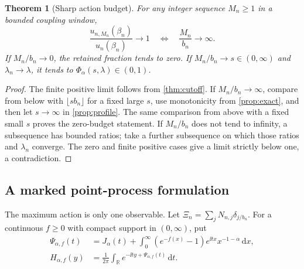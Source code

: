 \documentclass[11pt,a4paper]{article}
\numberwithin{equation}{section}
\newtheorem{theorem}{Theorem}[section]
\theoremstyle{definition}\newtheorem{definition}[theorem]{Definition}
\theoremstyle{remark}\newtheorem{remark}[theorem]{Remark}
\theoremstyle{definition}
\newcommand{\R}{\mathbb R}\newcommand{\C}{\mathbb C}
\newcommand{\dd}{\,\mathrm d}
\begin{document}
\begin{theorem}[Sharp action budget]\label{thm:budget}
For any integer sequence $M_n\ge1$ in a bounded coupling window,
\begin{equation}\label{eq:budgetiff}
 \frac{u_{n,M_n}(\beta_n)}{u_n(\beta_n)}\longrightarrow1
 \quad\Longleftrightarrow\quad \frac{M_n}{b_n}\longrightarrow\infty.
\end{equation}
If $M_n/b_n\to0$, the retained fraction tends to zero. If
$M_n/b_n\to s\in(0,\infty)$ and $\lambda_n\to\lambda$, it tends to
$\Phi_\alpha(s,\lambda)\in(0,1)$.
\end{theorem}
\begin{proof}
The finite positive limit follows from \cref{thm:cutoff}. If $M_n/b_n\to
\infty$, compare from below with $\lfloor s b_n\rfloor$ for a fixed large
$s$, use monotonicity from \cref{prop:exact}, and then let $s\to\infty$ in
\cref{prop:profile}. The same comparison from above with a fixed small $s$
proves the zero-budget statement. If $M_n/b_n$ does not tend to infinity,
a subsequence has bounded ratios; take a further subsequence on which
those ratios and $\lambda_n$ converge. The zero and finite positive cases
give a limit strictly below one, a contradiction.
\end{proof}

\subsection{A marked point-process formulation}
The maximum action is only one observable. Let
$\Xi_n=\sum_jN_{n,j}\delta_{j/b_n}$. For a continuous $f\ge0$ with compact
support in $(0,\infty)$, put
\begin{align}
 \Psi_{\alpha,f}(t)&=J_\alpha(t)
 +\int_0^\infty(e^{-f(x)}-1)e^{\ii tx}x^{-1-\alpha}\dd x,\label{eq:markexp}\\
 H_{\alpha,f}(y)&=\frac1{2\pi}\int_\R
                   e^{-\ii ty+\Psi_{\alpha,f}(t)}\dd t.\label{eq:markdensity}
\end{align}
\end{document}
